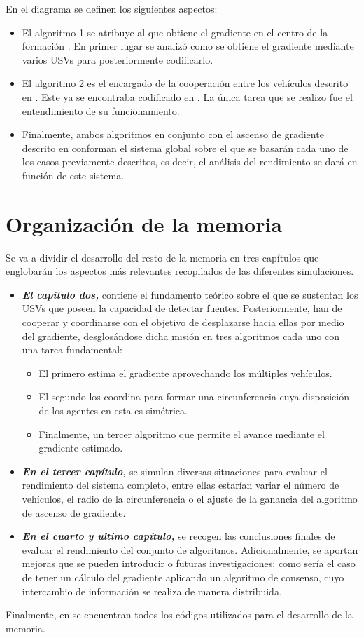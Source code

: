 En el diagrama se definen los siguientes aspectos:

\begin{itemize}
	\item El algoritmo 1 se atribuye al que obtiene el gradiente en el centro de la formación \cite{Estimacion_Gradiente}. En primer lugar se analizó como se obtiene el gradiente mediante varios USVs para posteriormente codificarlo.
	\item El algoritmo 2 es el encargado de la cooperación entre los vehículos descrito en \cite{Control_Formacion}. Este ya se encontraba codificado en \cite{Git_Hector}. La única tarea que se realizo fue el entendimiento de su funcionamiento.
	\item Finalmente, ambos algoritmos en conjunto con el ascenso de gradiente descrito en \cite{Adicional_Estimacion_1} conforman el sistema global sobre el que se basarán cada uno de los casos previamente descritos, es decir, el análisis del rendimiento se dará en función de este sistema.
\end{itemize}

\section{Organización de la memoria}

Se va a dividir el desarrollo del resto de la memoria en tres capítulos que englobarán los aspectos más relevantes recopilados de las diferentes simulaciones.

\begin{itemize}
	\item \textbf{\emph{El capítulo dos,}} contiene el fundamento teórico sobre el que se sustentan los USVs que poseen la capacidad de detectar fuentes. Posteriormente, han de cooperar y coordinarse con el objetivo de desplazarse hacia ellas por medio del gradiente, desglosándose dicha misión en tres algoritmos cada uno con una tarea fundamental: 
	\begin{itemize}
		\item El primero estima el gradiente aprovechando los múltiples vehículos.
		\item El segundo los coordina para formar una circunferencia cuya disposición de los agentes en esta es simétrica.
		\item Finalmente, un tercer algoritmo que permite el avance mediante el gradiente estimado.
	\end{itemize}
	\item  \textbf{\emph{En el tercer capítulo,}} se simulan diversas situaciones para evaluar el rendimiento del sistema completo, entre ellas estarían variar el número de vehículos, el radio de la circunferencia o el ajuste de la ganancia del algoritmo de ascenso de gradiente.
	\item \textbf{\emph{En el cuarto y ultimo capítulo,}} se recogen las conclusiones finales de evaluar el rendimiento del conjunto de algoritmos. Adicionalmente, se aportan mejoras que se pueden introducir o futuras investigaciones; como sería el caso de tener un cálculo del gradiente aplicando un algoritmo de consenso, cuyo intercambio de información se realiza de manera distribuida.
\end{itemize}

Finalmente, en \cite{Git__todos} se encuentran todos los códigos utilizados para el desarrollo de la memoria.
